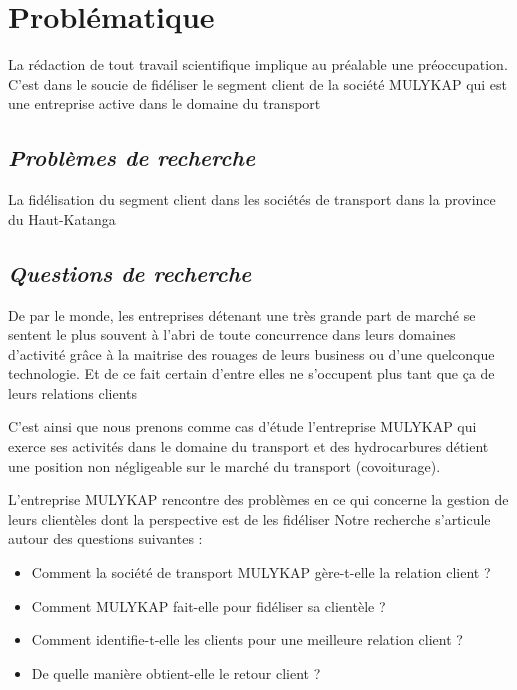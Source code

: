 \documentclass[a4paper,12pt,oneside]{book}
\begin{document}
        \section[Problématique]{Problématique}
        La rédaction de tout travail scientifique implique au préalable une préoccupation.
        C’est dans le soucie de fidéliser le segment client de la société MULYKAP qui est une
        entreprise active dans le domaine du transport
            \subsection[Problèmes de recherche]{\textit{Problèmes de recherche}}
            La fidélisation du segment client dans les sociétés de transport
            dans la province du Haut-Katanga

            \subsection[Questions de recherche]{\textit{Questions de recherche}}
            De par le monde, les entreprises détenant une très grande part de marché
            se sentent le plus souvent à l’abri de toute concurrence dans leurs domaines d’activité
            grâce à la maitrise des rouages de leurs business ou
            d’une quelconque technologie. \cite*{Rouviere2010} Et de ce fait certain
            d’entre elles ne s’occupent plus tant que ça de leurs relations clients
            \newline

            C’est ainsi que nous prenons comme cas d’étude l’entreprise MULYKAP qui exerce 
            ses activités dans le domaine du transport et des hydrocarbures détient
            une position non négligeable sur le marché du transport (covoiturage).
            \newline

            L’entreprise MULYKAP rencontre des problèmes en ce qui concerne
            la gestion de leurs clientèles dont la perspective est de les
            fidéliser
            Notre recherche s’articule autour des questions suivantes :
            \newline 
                \begin{itemize}
                    \item Comment la société de transport MULYKAP gère-t-elle
                    la relation client ?
                    \newline
                    \item Comment MULYKAP fait-elle pour fidéliser sa clientèle ?
                    \newline
                    \item Comment identifie-t-elle les clients pour une
                    meilleure relation client ?
                    \newline
                    \item De quelle manière obtient-elle le retour client ?
                \end{itemize}
\end{document}

